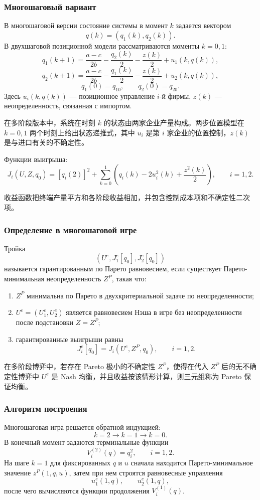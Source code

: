 \documentclass[12pt,a4paper]{article}
\newcommand{\zh}[1]{\par\noindent #1\par}
\begin{document}
\subsubsection{Многошаговый вариант}
В многошаговой версии состояние системы в момент $k$ задается вектором
\[
q(k)=(q_1(k),q_2(k)).
\]
В двухшаговой позиционной модели рассматриваются моменты $k=0,1$:
\[
q_1(k+1)=\frac{a-c}{2b}-\frac{q_2(k)}{2}-\frac{z(k)}{2}+u_1(k,q(k)),
\]
\[
q_2(k+1)=\frac{a-c}{2b}-\frac{q_1(k)}{2}-\frac{z(k)}{2}+u_2(k,q(k)),
\]
\[
q_1(0)=q_{10},\qquad q_2(0)=q_{20}.
\]
Здесь $u_i(k,q(k))$ --- позиционное управление $i$-й фирмы, $z(k)$ --- неопределенность, связанная с импортом.

\zh{在多阶段版本中，系统在时刻 $k$ 的状态由两家企业产量构成。两步位置模型在 $k=0,1$ 两个时刻上给出状态递推式，其中 $u_i$ 是第 $i$ 家企业的位置控制，$z(k)$ 是与进口有关的不确定性。}

Функции выигрыша:
\[
J_i(U,Z,q_0)=[q_i(2)]^2+\sum_{k=0}^{1}\left(q_i(k)-2u_i^2(k)+\frac{z^2(k)}{2}\right),
\qquad i=1,2.
\]

\zh{收益函数把终端产量平方和各阶段收益相加，并包含控制成本项和不确定性二次项。}

\subsubsection{Определение в многошаговой игре}
Тройка
\[
(U^e,J_1^e[q_0],J_2^e[q_0])
\]
называется гарантированным по Парето равновесием, если существует Парето-минимальная неопределенность $Z^P$, такая что:
\begin{enumerate}
  \item $Z^P$ минимальна по Парето в двухкритериальной задаче по неопределенности;
  \item $U^e=(U_1^e,U_2^e)$ является равновесием Нэша в игре без неопределенности после подстановки $Z=Z^P$;
  \item гарантированные выигрыши равны
  \[
  J_i^e[q_0]=J_i(U^e,Z^P,q_0),\qquad i=1,2.
  \]
\end{enumerate}

\zh{在多阶段博弈中，若存在 Pareto 极小的不确定性 $Z^P$，使得在代入 $Z^P$ 后的无不确定性博弈中 $U^e$ 是 Nash 均衡，并且收益按该情形计算，则三元组称为 Pareto 保证均衡。}

\subsubsection{Алгоритм построения}
Многошаговая игра решается обратной индукцией:
\[
k=2\rightarrow k=1\rightarrow k=0.
\]
В конечный момент задаются терминальные функции
\[
V_i^{(2)}(q)=q_i^2,
\qquad i=1,2.
\]
На шаге $k=1$ для фиксированных $q$ и $u$ сначала находится Парето-минимальное значение $z^P(1,q,u)$, затем при нем строятся равновесные управления
\[
u_1^e(1,q),\qquad u_2^e(1,q),
\]
после чего вычисляются функции продолжения $V_i^{(1)}(q)$.
\end{document}
